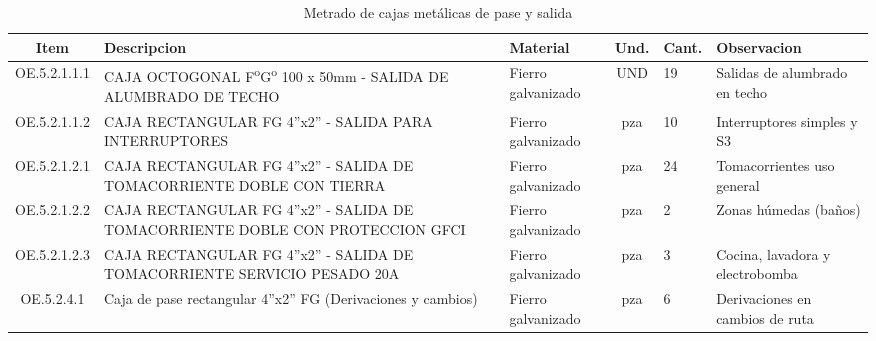 \begin{table}[H]
\centering
\small
\caption{Metrado de cajas metálicas de pase y salida}
\label{tab:metrado-cajas}
\begin{tabularx}{\textwidth}{c L{4.5cm} L{2.5cm} c L{2.5cm} Y}
\toprule
\textbf{Item} & \textbf{Descripcion} & \textbf{Material} & \textbf{Und.} & \textbf{Cant.} & \textbf{Observacion} \\
\midrule
OE.5.2.1.1.1 & CAJA OCTOGONAL F\textsuperscript{o}G\textsuperscript{o} 100 x 50mm - SALIDA DE ALUMBRADO DE TECHO & Fierro galvanizado & UND & 19 & Salidas de alumbrado en techo \\
OE.5.2.1.1.2 & CAJA RECTANGULAR FG 4''x2'' - SALIDA PARA INTERRUPTORES & Fierro galvanizado & pza & 10 & Interruptores simples y S3 \\
OE.5.2.1.2.1 & CAJA RECTANGULAR FG 4''x2'' - SALIDA DE TOMACORRIENTE DOBLE CON TIERRA & Fierro galvanizado & pza & 24 & Tomacorrientes uso general \\
OE.5.2.1.2.2 & CAJA RECTANGULAR FG 4''x2'' - SALIDA DE TOMACORRIENTE DOBLE CON PROTECCION GFCI & Fierro galvanizado & pza & 2 & Zonas húmedas (baños) \\
OE.5.2.1.2.3 & CAJA RECTANGULAR FG 4''x2'' - SALIDA DE TOMACORRIENTE SERVICIO PESADO 20A & Fierro galvanizado & pza & 3 & Cocina, lavadora y electrobomba \\
OE.5.2.4.1 & Caja de pase rectangular 4''x2'' FG (Derivaciones y cambios) & Fierro galvanizado & pza & 6 & Derivaciones en cambios de ruta \\
\bottomrule
\end{tabularx}
\end{table}
